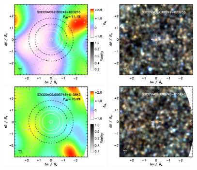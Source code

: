 \documentclass[a4paper, fleqn, usenatbib]{mnras}
\begin{document}
\begin{figure}
    \centering
    \includegraphics[width=0.5\textwidth]{S2COSMOSJ100249+023255-overdensity}
    \includegraphics[width=0.41\textwidth]{S2COSMOSJ100249+023255-spire-rgb}\\\vspace{1em}
    \includegraphics[width=0.5\textwidth]{S2COSMOSJ095748+015843-overdensity}
    \includegraphics[width=0.41\textwidth]{S2COSMOSJ095748+015843-spire-rgb}\\\vspace{1em}

\end{figure}
\end{document}
